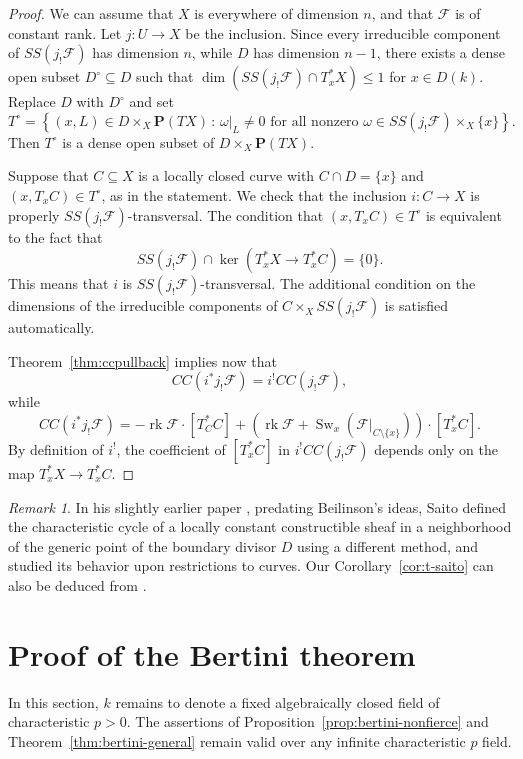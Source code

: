 \documentclass[twoside]{amsart}
\newcommand{\PP}{\mathbf{P}}
\newcommand{\Ff}{\mathscr{F}}
\DeclareMathOperator{\Swan}{Sw}
\DeclareMathOperator{\rk}{rk}
\renewcommand{\to}{\longrightarrow}
\theoremstyle{plain}
\theoremstyle{definition}
\theoremstyle{remark}
\newtheorem{remark}[subsubsection]{Remark}
\numberwithin{equation}{subsection}
\begin{document}
\begin{proof}
We can assume that $X$ is everywhere of dimension $n$, and that $\Ff$ is of constant rank. Let $j\colon U\to X$ be the inclusion. Since every irreducible component of $SS(j_! \Ff)$ has dimension $n$, while $D$ has dimension $n-1$, there exists a dense open subset $D^\circ\subseteq D$ such that $\dim (SS(j_! \Ff) \cap T^*_x X)\leq 1$ for $x\in D(k)$. Replace $D$ with $D^\circ$ and set 
\[ 
	T^\circ =  \left\{ (x, L)\in D\times_X \PP(T X) \, :\, \omega|_L  \neq 0 \text{ for all nonzero }\omega\in SS(j_! \Ff)\times_X \{x\} \right\}.
\]
Then $T^\circ$ is a dense open subset of $D\times_X \PP(T X)$. 

Suppose that $C\subseteq X$ is a locally closed curve with $C\cap D=\{x\}$ and $(x, T_x C) \in T^\circ$, as in the statement. We check that the inclusion $i\colon C\to X$ is properly $SS(j_!\Ff)$-transversal. The condition that $(x, T_x C)\in T^\circ$ is equivalent to the fact that 
\[ 
	SS(j_! \Ff) \cap \ker\left( T^*_x X \to T^*_x C\right) = \{0\}.
\]
This means that $i$ is $SS(j_!\Ff)$-transversal. The additional condition on the dimensions of the irreducible components of $C\times_X SS(j_! \Ff)$ is satisfied automatically.

Theorem~\ref{thm:ccpullback} implies now that
\[ 
	CC(i^* j_!\Ff) = i^! CC(j_! \Ff),
\]
while
\[ 
	CC(i^* j_! \Ff) = - \rk\Ff \cdot [T^*_C C] + (\rk\Ff + \Swan_x(\Ff|_{C\setminus\{x\}}))\cdot [T^*_x C].
\]
By definition of $i^!$, the coefficient of $[T^*_x C]$ in $i^! CC(j_! \Ff)$ depends only on the map $T^*_x X \to T^*_x C$.
\end{proof}

\begin{remark}
In his slightly earlier paper \cite{Saito}, predating Beilinson's ideas, Saito defined the characteristic cycle of a locally constant constructible sheaf in a neighborhood of the generic point of the boundary divisor $D$ using a different method, and studied its behavior upon restrictions to curves. Our Corollary~\ref{cor:t-saito} can also be deduced from \cite[Corollary 3.9.2]{Saito}.
\end{remark}

\section{Proof of the Bertini theorem} 
\label{s:bertini}

In this section, $k$ remains to denote a fixed algebraically closed field of characteristic $p>0$. The assertions of Proposition~\ref{prop:bertini-nonfierce} and Theorem~\ref{thm:bertini-general} remain valid over any infinite characteristic $p$ field.
\end{document}
